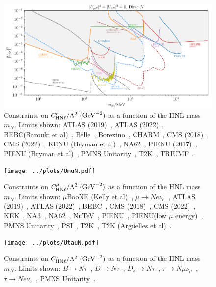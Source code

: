 \documentclass{revtex4-2}%
\begin{document}
%
\normalsize%


\begin{figure}[h!]%
\centering%
\includegraphics[width=1\textwidth]{../plots/UeN.pdf}%
\caption{Constraints on $C_{\rm{HN}\ell}^{e}/\Lambda^2 ~(\rm{GeV}^{-2})$ as a function of the HNL mass $m_N$. Limits shown: ATLAS (2019)~\cite{ATLAS:2019kpx}, ATLAS (2022)~\cite{ATLAS:2022atq}, BEBC(Barouki et al)~\cite{Barouki:2022bkt}, Belle~\cite{Belle:2013ytx}, Borexino~\cite{Borexino:2013bot}, CHARM~\cite{CHARM:1985nku}, CMS (2018)~\cite{CMS:2018iaf}, CMS (2022)~\cite{CMS:2022fut}, KENU (Bryman et al)~\cite{Bryman:2019bjg}, NA62~\cite{NA62:2020mcv}, PIENU (2017)~\cite{PIENU:2017wbj}, PIENU (Bryman et al)~\cite{Bryman:2019bjg}, PMNS Unitarity~\cite{Work in progress}, T2K~\cite{T2K:2019jwa}, TRIUMF~\cite{Britton:1992xv}.}%
\end{figure}

%


\begin{figure}[h!]%
\centering%
\texttt{[image: ../plots/UmuN.pdf]}%
\caption{Constraints on $C_{\rm{HN}\ell}^{\mu}/\Lambda^2 ~(\rm{GeV}^{-2})$ as a function of the HNL mass $m_N$. Limits shown: $\mu$BooNE (Kelly et al)~\cite{Kelly:2021xbv}, $\mu\to N e \nu_e$~\cite{ParticleDataGroup:2022pth}, ATLAS (2019)~\cite{ATLAS:2019kpx}, ATLAS (2022)~\cite{ATLAS:2022atq}, BEBC~\cite{WA66:1985mfx}, CMS (2018)~\cite{CMS:2018iaf}, CMS (2022)~\cite{CMS:2022fut}, KEK~\cite{Bryman:2019bjg}, NA3~\cite{NA3:1986ahv}, NA62~\cite{NA62:2021bji}, NuTeV~\cite{NuTeV:1999kej}, PIENU~\cite{PIENU:2019usb}, PIENU(low $\mu$ energy)~\cite{PIENU:2019usb}, PMNS Unitarity~\cite{Work in progress}, PSI~\cite{Daum:1987bg}, T2K~\cite{T2K:2019jwa}, T2K (Arg\"uelles et al)~\cite{Arguelles:2021dqn}.}%
\end{figure}

%


\begin{figure}[h!]%
\centering%
\texttt{[image: ../plots/UtauN.pdf]}%
\caption{Constraints on $C_{\rm{HN}\ell}^{\tau}/\Lambda^2 ~(\rm{GeV}^{-2})$ as a function of the HNL mass $m_N$. Limits shown: $B\to N\tau$~\cite{ParticleDataGroup:2022pth}, $D\to N\tau$~\cite{ParticleDataGroup:2022pth}, $D_s\to N\tau$~\cite{ParticleDataGroup:2022pth}, $\tau\to N \mu \nu_\mu$~\cite{ParticleDataGroup:2022pth}, $\tau\to N e \nu_e$~\cite{ParticleDataGroup:2022pth}, PMNS Unitarity~\cite{Work in progress}.}%
\end{figure}

%
%
%
\end{document}
